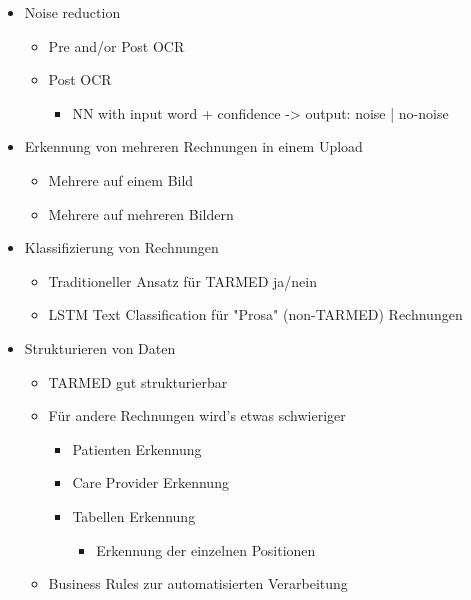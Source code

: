 \documentclass{hwz}
\begin{document}
\begin{itemize}
\begin{itemize}
\begin{itemize}
        \end{itemize}
    \end{itemize}
    \item Noise reduction
    \begin{itemize}
	    \item Pre and/or Post OCR
        \item Post OCR
        \begin{itemize}
	    	\item NN with input word + confidence -> output: noise | no-noise
        \end{itemize}
    \end{itemize}
    \item Erkennung von mehreren Rechnungen in einem Upload
    \begin{itemize}
	    \item Mehrere auf einem Bild
	    \item Mehrere auf mehreren Bildern
    \end{itemize}
    \item Klassifizierung von Rechnungen
    \begin{itemize}
		\item Traditioneller Ansatz für TARMED ja/nein
		\item LSTM Text Classification für "Prosa" (non-TARMED) Rechnungen
    \end{itemize}
    \item Strukturieren von Daten
    \begin{itemize}
		\item TARMED gut strukturierbar
		\item Für andere Rechnungen wird’s etwas schwieriger
        \begin{itemize}
			\item Patienten Erkennung
			\item Care Provider Erkennung
			\item Tabellen Erkennung
            \begin{itemize}
			    \item Erkennung der einzelnen Positionen
            \end{itemize}
        \end{itemize}
        \item Business Rules zur automatisierten Verarbeitung    
    \end{itemize}  
\end{itemize}
\end{document}
